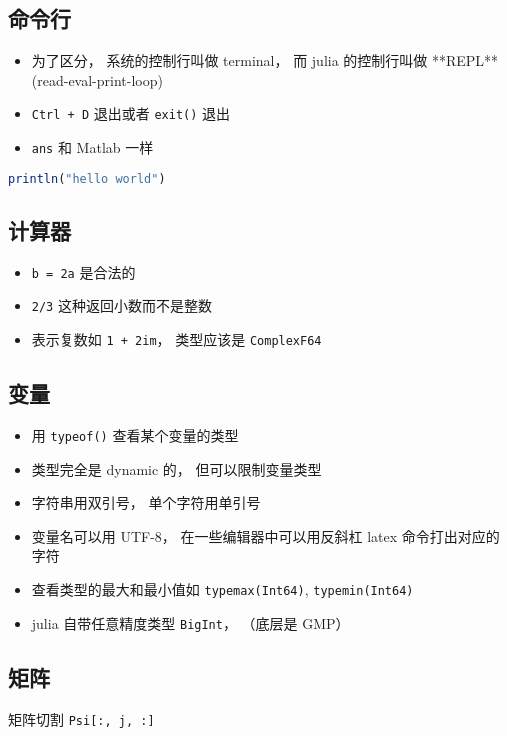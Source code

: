 
\begin{issues}
\issueDraft
\end{issues}

\subsection{命令行}
\begin{itemize}
\item 为了区分， 系统的控制行叫做 terminal， 而 julia 的控制行叫做 **REPL** (read-eval-print-loop)
\item \verb|Ctrl + D| 退出或者 \verb|exit()| 退出
\item \verb|ans| 和 Matlab 一样
\end{itemize}

\begin{lstlisting}[language=julia]
println("hello world")
\end{lstlisting}

\subsection{计算器}
\begin{itemize}
\item \verb|b = 2a| 是合法的
\item \verb|2/3| 这种返回小数而不是整数
\item 表示复数如 \verb|1 + 2im|， 类型应该是 \verb|ComplexF64|
\end{itemize}

\subsection{变量}
\begin{itemize}
\item 用 \verb|typeof()| 查看某个变量的类型
\item 类型完全是 dynamic 的， 但可以限制变量类型
\item 字符串用双引号， 单个字符用单引号
\item 变量名可以用 UTF-8， 在一些编辑器中可以用反斜杠 latex 命令打出对应的字符
\item 查看类型的最大和最小值如 \verb|typemax(Int64)|, \verb|typemin(Int64)|
\item julia 自带任意精度类型 \verb|BigInt|，  （底层是 GMP）
\end{itemize}

\subsection{矩阵}
矩阵切割 \verb|Psi[:, j, :]|

